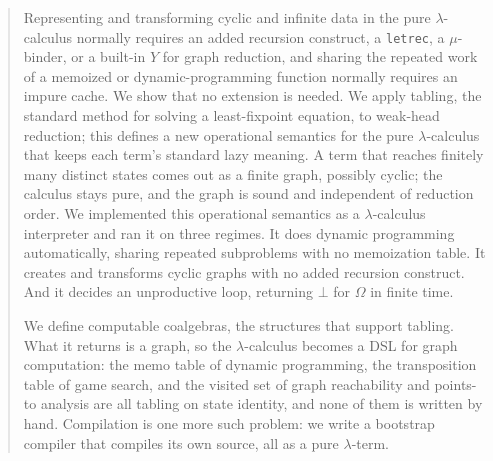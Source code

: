 \ifColambdaBody
\begin{abstract}
  Representing and transforming cyclic and infinite data in the pure $\lambda$-calculus normally requires an added recursion construct, a \texttt{letrec}, a $\mu$-binder, or a built-in $Y$ for graph reduction, and sharing the repeated work of a memoized or dynamic-programming function normally requires an impure cache. We show that no extension is needed. We apply tabling, the standard method for solving a least-fixpoint equation, to weak-head reduction; this defines a new operational semantics for the pure $\lambda$-calculus that keeps each term's standard lazy meaning. A term that reaches finitely many distinct states comes out as a finite graph, possibly cyclic; the calculus stays pure, and the graph is sound and independent of reduction order. We implemented this operational semantics as a $\lambda$-calculus interpreter and ran it on three regimes. It does dynamic programming automatically, sharing repeated subproblems with no memoization table. It creates and transforms cyclic graphs with no added recursion construct. And it decides an unproductive loop, returning $\bot$ for $\Omega$ in finite time.

  We define computable coalgebras, the structures that support tabling. What it returns is a graph, so the $\lambda$-calculus becomes a DSL for graph computation: the memo table of dynamic programming, the transposition table of game search, and the visited set of graph reachability and points-to analysis are all tabling on state identity, and none of them is written by hand. Compilation is one more such problem: we write a bootstrap compiler that compiles its own source, all as a pure $\lambda$-term.
\end{abstract}

